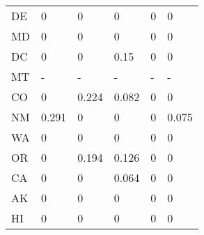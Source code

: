 \begin{table}[ht!]
\begin{tabular}{llllll}
DE          & 0               & 0              & 0               & 0                & 0               \\
MD          & 0               & 0              & 0               & 0                & 0               \\
DC          & 0               & 0              & 0.15            & 0                & 0               \\
MT          & -               & -              & -               & -                & -               \\
CO          & 0               & 0.224          & 0.082           & 0                & 0               \\
NM          & 0.291           & 0              & 0               & 0                & 0.075           \\
WA          & 0               & 0              & 0               & 0                & 0               \\
OR          & 0               & 0.194          & 0.126           & 0                & 0               \\
CA          & 0               & 0              & 0.064           & 0                & 0               \\
AK          & 0               & 0              & 0               & 0                & 0               \\
HI          & 0               & 0              & 0               & 0                & 0 \\
\hline
\end{tabular}
\end{table}